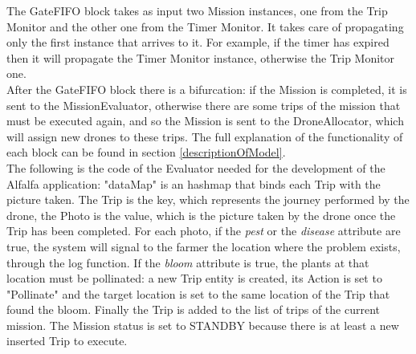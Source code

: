 The GateFIFO block takes as input two Mission instances, one from the Trip Monitor and the other one from the Timer Monitor.
It takes care of propagating only the first instance that arrives to it.
For example, if the timer has expired then it will propagate the Timer Monitor instance, otherwise the Trip Monitor one.
\\

After the GateFIFO block there is a bifurcation:
if the Mission is completed, it is sent to the MissionEvaluator, otherwise there are some trips of the mission that must be executed again, and so the Mission is sent to the DroneAllocator, which will assign new drones to these trips.
The full explanation of the functionality of each block can be found in section \ref{descriptionOfModel}.
\\

The following is the code of the Evaluator needed for the development of the Alfalfa\cite{alfalfa} application:
"dataMap" is an hashmap that binds each Trip with the picture taken. The Trip is the key, which represents the journey performed by the drone, the Photo is the value, which is the picture taken by the drone once the Trip has been completed.
For each photo, if the \textit{pest} or the \textit{disease} attribute are true, the system will signal to the farmer the location where the problem exists, through the log function.
If the \textit{bloom} attribute is true, the plants at that location must be pollinated: a new Trip entity is created, its Action is set to "Pollinate" and the target location is set to the same location of the Trip that found the bloom.
Finally the Trip is added to the list of trips of the current mission.
The Mission status is set to STANDBY because there is at least a new inserted Trip to execute.
\\


